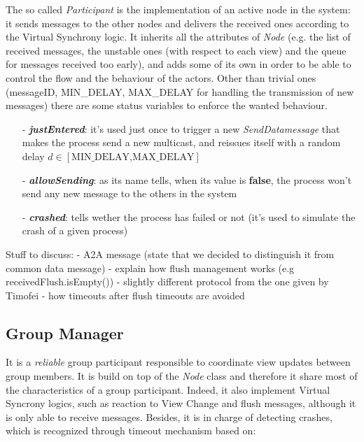 \documentclass[11pt]{article}
\begin{document}
	The so called \textit{Participant} is the implementation of an active node in the system: it sends messages to the other nodes and delivers the received ones according to the Virtual Synchrony logic.\newline
	It inherits all the attributes of \textit{Node} (e.g. the list of received messages, the unstable ones (with respect to each view) and the queue for messages received too early), and adds some of its own in order to be able to control the flow and the behaviour of the actors. Other than trivial ones (messageID, MIN\_DELAY, MAX\_DELAY for handling the transmission of new messages) there are some status variables to enforce the wanted behaviour. 
	\begin{itemize}
		\item [-] \textit{\textbf{justEntered}}: it's used just once to trigger a new \textit{SendDatamessage} that makes the process send a new multicast, and reissues itself with a random delay $d \in [\text{MIN\_DELAY,MAX\_DELAY}]$
		\item [-] \textit{\textbf{allowSending}}: as its name tells, when its value is \textbf{false}, the process won't send any new message to the others in the system
		\item [-] \textit{\textbf{crashed}}: tells wether the process has failed or not (it's used to simulate the crash of a given process)
	\end{itemize}
	
		
	Stuff to discuss:
	- A2A message (state that we decided to distinguish it from common data message)
	- explain how flush management works (e.g receivedFlush.isEmpty())
	- slightly different protocol from the one given by Timofei
	- how timeouts after flush timeouts are avoided
		
	\subsection{Group Manager}
	It is a \textit{reliable} group participant responsible to coordinate view updates between group members. It is build on top of the \textit{Node} class and therefore it share most of the characteristics of a group participant. Indeed, it also implement Virtual Syncrony logics, such as reaction to View Change and flush messages, although it is only able to receive messages. Besides, it is in charge of detecting crashes, which is recognized through timeout mechanism based on:
	
\end{document}
